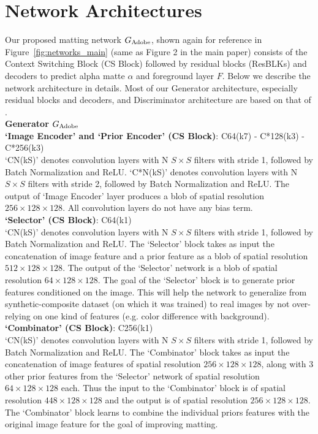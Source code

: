 \documentclass[10pt,twocolumn,letterpaper]{article}
\begin{document}
\section{Network Architectures}
\label{sec:arch}

Our proposed matting network $G_{\rm Adobe}$, shown again for reference in Figure~\ref{fig:networks_main} (same as Figure 2 in the main paper) consists of the Context Switching Block (CS Block) followed by residual blocks (ResBLKs) and decoders to predict alpha matte $\alpha$ and foreground layer $F$. Below we describe the network architecture in details. Most of our Generator architecture, especially residual blocks and decoders, and Discriminator architecture are based on that of \cite{zhu2017unpaired}.
\\
\noindent
\textbf{Generator $G_{\rm Adobe}$\\}
\noindent
\textbf{`Image Encoder' and `Prior Encoder' (CS Block)}: C64(k7) - C*128(k3) - C*256(k3)\\
`CN(kS)' denotes convolution layers with N $S \times S$ filters with stride 1, followed by Batch Normalization and ReLU. `C*N(kS)' denotes convolution layers with N $S \times S$ filters with stride 2, followed by Batch Normalization and ReLU. The output of `Image Encoder' layer produces a blob of spatial resolution $256 \times 128 \times 128$. All convolution layers do not have any bias term.\\
\noindent
\textbf{`Selector' (CS Block)}: C64(k1)\\
`CN(kS)' denotes convolution layers with N $S \times S$ filters with stride 1, followed by Batch Normalization and ReLU. The `Selector' block takes as input the concatenation of image feature and a prior feature as a blob of spatial resolution $512 \times 128 \times 128$. The output of the `Selector' network is a blob of spatial resolution $64 \times 128 \times 128$. The goal of the `Selector' block is to generate prior features conditioned on the image. This will help the network to generalize from synthetic-composite dataset (on which it was trained) to real images by not over-relying on one kind of features (e.g. color difference with background).\\
\noindent
\textbf{`Combinator' (CS Block)}: C256(k1)\\
`CN(kS)' denotes convolution layers with N $S \times S$ filters with stride 1, followed by Batch Normalization and ReLU. The `Combinator' block takes as input the concatenation of image features of spatial resolution $256 \times 128 \times 128$, along with 3 other prior features from the `Selector' network of spatial resolution $64 \times 128 \times 128$ each. Thus the input to the `Combinator' block is of spatial resolution $448 \times 128 \times 128$ and the output is of spatial resolution $256 \times 128 \times 128$. The `Combinator' block learns to combine the individual priors features with the original image feature for the goal of improving matting.\\
\end{document}
